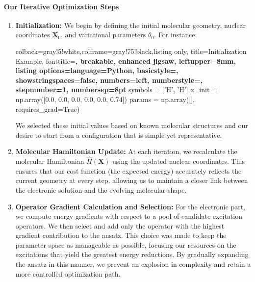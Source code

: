 \paragraph{Our Iterative Optimization Steps}
\begin{enumerate}
    \item \textbf{Initialization:}
    We begin by defining the initial molecular geometry, nuclear coordinates \(\mathbf{X}_0\), and variational parameters \(\theta_0\). For instance:
    \begin{tcblisting}{colback=gray!5!white,colframe=gray!75!black,listing only,
      title=Initialization Example, fonttitle=\bfseries, breakable, enhanced jigsaw, leftupper=8mm,
      listing options={language=Python, basicstyle=\ttfamily\small,
      showstringspaces=false, numbers=left, numberstyle=\footnotesize, stepnumber=1, numbersep=8pt}}
symbols = ['H', 'H']
x_init = np.array([0.0, 0.0, 0.0, 0.0, 0.0, 0.74])
params = np.array([], requires_grad=True)
    \end{tcblisting}
    We selected these initial values based on known molecular structures and our desire to start from a configuration that is simple yet representative.

    \item \textbf{Molecular Hamiltonian Update:}
    At each iteration, we recalculate the molecular Hamiltonian \(\hat{H}(\mathbf{X})\) using the updated nuclear coordinates. This ensures that our cost function (the expected energy) accurately reflects the current geometry at every step, allowing us to maintain a closer link between the electronic solution and the evolving molecular shape.

    \item \textbf{Operator Gradient Calculation and Selection:}
    For the electronic part, we compute energy gradients with respect to a pool of candidate excitation operators. We then select and add only the operator with the highest gradient contribution to the ansatz. This choice was made to keep the parameter space as manageable as possible, focusing our resources on the excitations that yield the greatest energy reductions. By gradually expanding the ansatz in this manner, we prevent an explosion in complexity and retain a more controlled optimization path.


\end{enumerate}
